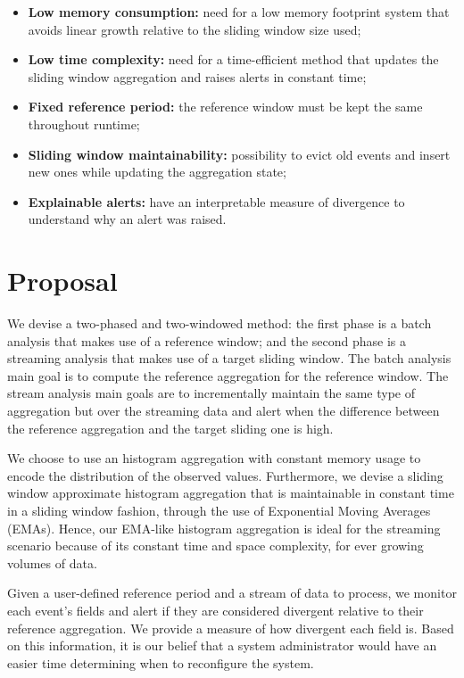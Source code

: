 \begin{itemize}
    \item \textbf{Low memory consumption:} need for a low memory footprint system that avoids linear growth relative to the sliding window size used;
    
    \item \textbf{Low time complexity:} need for a time-efficient method that updates the sliding window aggregation and raises alerts in constant time;
    
    \item \textbf{Fixed reference period:} the reference window must be kept the same throughout runtime;
    
    \item \textbf{Sliding window maintainability:} possibility to evict old events and insert new ones while updating the aggregation state;
    
    \item \textbf{Explainable alerts:} have an interpretable measure of divergence to understand why an alert was raised.
\end{itemize}


\section{Proposal}
We devise a two-phased and two-windowed method: the first phase is a batch analysis that makes use of a reference window; and the second phase is a streaming analysis that makes use of a target sliding window. The batch analysis main goal is to compute the reference aggregation for the reference window. The stream analysis main goals are to incrementally maintain the same type of aggregation but over the streaming data and alert when the difference between the reference aggregation and the target sliding one is high.

We choose to use an histogram aggregation with constant memory usage to encode the distribution of the observed values. Furthermore, we devise a sliding window approximate histogram aggregation that is maintainable in constant time in a sliding window fashion, through the use of Exponential Moving Averages (EMAs). Hence, our EMA-like histogram aggregation is ideal for the streaming scenario because of its constant time and space complexity, for ever growing volumes of data.

Given a user-defined reference period and a stream of data to process, we monitor each event's fields and alert if they are considered divergent relative to their reference aggregation. We provide a measure of how divergent each field is. Based on this information, it is our belief that a system administrator would have an easier time determining when to reconfigure the system.

